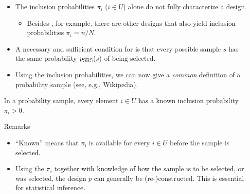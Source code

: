 \documentclass{my_eth_beamer}
\numberwithin{equation}{section}
\begin{document}
\begin{frame}
    \begin{itemize}
    \setlength{\itemsep}{10pt}
        \item The inclusion probabilities $\pi_i$ ($i \in U$) \alert{alone}
            do not fully characterize a design.
            \vspace{0.25em}
            \begin{itemize}
                \item[\goto] Besides \SRS, for example, there are other designs
                    that also yield inclusion probabilities $\pi_i = n/N$.
            \end{itemize}
        \item A \alert{necessary and sufficient condition} for \SRS is that
            every possible sample $s$ has the same probability
            $p_{\mathrm{SRS}}(s)$ of being selected.
        \item Using the inclusion probabilities, we can now give a
            \emph{common} definition of a probability sample (see, e.g.,
            Wikipedia).
    \end{itemize}

    \vspace{1em}

    \begin{Def}\label{def:probsample}
        \vspace{-0.5em}
        In a \alert{probability sample}, every element $i \in U$ has a
        \alert{known} inclusion probability $\pi_i > 0$.
    \end{Def}
\end{frame}

\begin{frame}
    Remarks
    \vspace{0.25em}
    \begin{itemize}
    \setlength{\itemsep}{8pt}
        \item ``Known'' means that $\pi_i$ is available for every $i \in U$
            before the sample is selected.
        \item Using the $\pi_i$ \alert{together with knowledge of how} the
            sample is to be selected, or was selected, the design $p$ can
            generally be (re-)constructed. This is essential for statistical
            inference.
    \end{itemize}
\end{frame}
\end{document}
